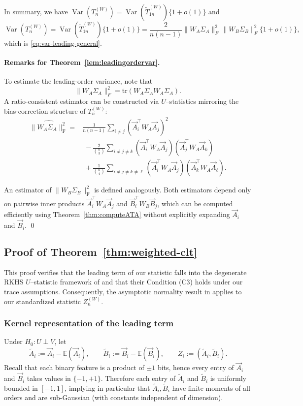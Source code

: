 \documentclass[12pt,reqno,oneside]{amsbook}
\theoremstyle{definition}
\theoremstyle{remark}
\DeclareMathOperator{\Var}{Var}
\begin{document}
In summary, we have $\Var(T_n^{(W)})=\Var(\tilde T_{1n}^{(W)})\{1+o(1)\}$ 
and
\[
\Var(T_n^{(W)})
=
\Var(\tilde T_{1n}^{(W)})\{1+o(1)\}
=
\frac{2}{n(n-1)}\|W_A\Sigma_A\|_F^2\,\|W_B\Sigma_B\|_F^2\{1+o(1)\},
\]
which is \eqref{eq:var-leading-general}.


\paragraph{Remarks for Theorem~\ref{lem:leadingordervar}.}
To estimate the leading-order variance, note that
\[
\|W_A\Sigma_A\|_F^2=\mbox{tr}(W_A\Sigma_AW_A\Sigma_A).
\]
A ratio-consistent estimator can be constructed via $U$--statistics mirroring
the bias-correction structure of $T_n^{(W)}$:
\[
\begin{aligned}
\widehat{\|W_A\Sigma_A\|_{\mathrm F}^2}
={}& \frac{1}{n(n-1)}\sum_{i\ne j}
   (\vec A_i^\top W_A \vec A_j)^2  \\
&\;-\frac{2}{\binom{n}{3}}\sum_{i\ne j\ne k}
   (\vec A_i^\top W_A \vec A_j)
   (\vec A_j^\top W_A \vec A_k)  \\
&\;+\frac{1}{\binom{n}{4}}\sum_{i\ne j\ne k\ne\ell}
   (\vec A_i^\top W_A \vec A_j)
   (\vec A_k^\top W_A \vec A_\ell).
\end{aligned}
\]

An estimator of $\|W_B\Sigma_B\|_{\mathrm F}^2$ is defined analogously.
Both estimators depend only on pairwise inner products
$\vec A_i^\top W_A \vec A_j$ and $\vec B_i^\top W_B \vec B_j$, which can be
computed efficiently using Theorem~\ref{thm:computeATA} without explicitly
expanding $\vec A_i$ and $\vec B_i$. \qed


\subsection{Proof of Theorem~\ref{thm:weighted-clt}}
\label{Normalization proof}

This proof verifies that the leading term of our statistic falls into the
degenerate RKHS $U$--statistic framework of \citet{HeZhongCuiMandrekar2023} and
that their Condition (C3) holds under our trace assumptions. Consequently, the
asymptotic normality result in \citet{HeZhongCuiMandrekar2023} applies to our
standardized statistic $Z_n^{(W)}$.

\subsubsection{Kernel representation of the leading term}
Under $H_0:U\perp V$, let
\[
\tilde A_i := \vec A_i-\mathbb E(\vec A_i),\qquad
\tilde B_i := \vec B_i-\mathbb E(\vec B_i),
\qquad
Z_i := (\tilde A_i,\tilde B_i).
\]
Recall that each binary feature is a product of $\pm1$ bits, hence every entry
of $\vec A_i$ and $\vec B_i$ takes values in $\{-1,+1\}$. Therefore each entry
of $\tilde A_i$ and $\tilde B_i$ is uniformly bounded in $[-1,1]$, implying in
particular that $\tilde A_i,\tilde B_i$ have finite moments of all orders and
are sub-Gaussian (with constants independent of dimension).
\end{document}
